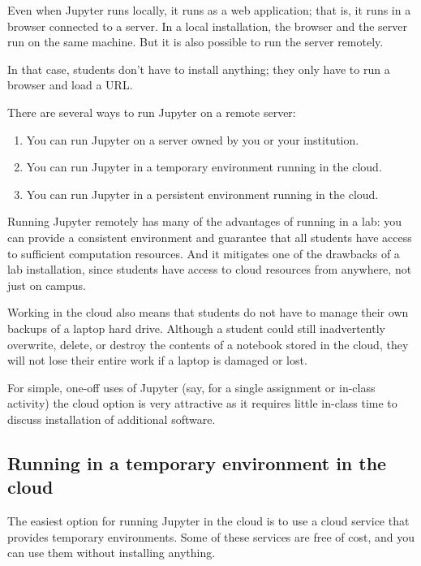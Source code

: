 \documentclass[]{book}
\providecommand{\tightlist}{%
  \setlength{\itemsep}{0pt}\setlength{\parskip}{0pt}}
\begin{document}
Even when Jupyter runs locally, it runs as a web application; that is,
it runs in a browser connected to a server. In a local installation, the
browser and the server run on the same machine. But it is also possible
to run the server remotely.

In that case, students don't have to install anything; they only have to
run a browser and load a URL.

There are several ways to run Jupyter on a remote server:

\begin{enumerate}
\def\labelenumi{\arabic{enumi}.}
\tightlist
\item
  You can run Jupyter on a server owned by you or your institution.
\item
  You can run Jupyter in a temporary environment running in the cloud.
\item
  You can run Jupyter in a persistent environment running in the cloud.
\end{enumerate}

Running Jupyter remotely has many of the advantages of running in a lab:
you can provide a consistent environment and guarantee that all students
have access to sufficient computation resources. And it mitigates one of
the drawbacks of a lab installation, since students have access to cloud
resources from anywhere, not just on campus.

Working in the cloud also means that students do not have to manage
their own backups of a laptop hard drive. Although a student could still
inadvertently overwrite, delete, or destroy the contents of a notebook
stored in the cloud, they will not lose their entire work if a laptop is
damaged or lost.

For simple, one-off uses of Jupyter (say, for a single assignment or
in-class activity) the cloud option is very attractive as it requires
little in-class time to discuss installation of additional software.

\subsection{Running in a temporary environment in the
cloud}\label{running-in-a-temporary-environment-in-the-cloud}

The easiest option for running Jupyter in the cloud is to use a cloud
service that provides temporary environments. Some of these services are
free of cost, and you can use them without installing anything.
\end{document}
